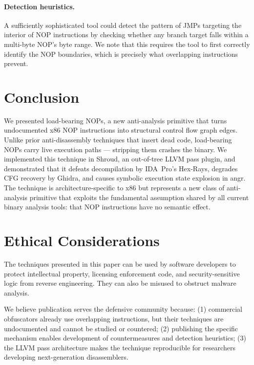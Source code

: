 \documentclass[letterpaper,twocolumn,10pt]{article}
\begin{document}
\paragraph{Detection heuristics.} A sufficiently sophisticated tool could detect the pattern of JMPs targeting the interior of NOP instructions by checking whether any branch target falls within a multi-byte NOP's byte range. We note that this requires the tool to first correctly identify the NOP boundaries, which is precisely what overlapping instructions prevent.

\section{Conclusion}

We presented load-bearing NOPs, a new anti-analysis primitive that turns undocumented x86 NOP instructions into structural control flow graph edges. Unlike prior anti-disassembly techniques that insert dead code, load-bearing NOPs carry live execution paths --- stripping them crashes the binary. We implemented this technique in Shroud, an out-of-tree LLVM pass plugin, and demonstrated that it defeats decompilation by IDA~Pro's Hex-Rays, degrades CFG recovery by Ghidra, and causes symbolic execution state explosion in angr. The technique is architecture-specific to x86 but represents a new class of anti-analysis primitive that exploits the fundamental assumption shared by all current binary analysis tools: that NOP instructions have no semantic effect.

\cleardoublepage
\appendix
\section*{Ethical Considerations}

The techniques presented in this paper can be used by software developers to protect intellectual property, licensing enforcement code, and security-sensitive logic from reverse engineering. They can also be misused to obstruct malware analysis.

We believe publication serves the defensive community because: (1) commercial obfuscators already use overlapping instructions, but their techniques are undocumented and cannot be studied or countered; (2) publishing the specific mechanism enables development of countermeasures and detection heuristics; (3) the LLVM pass architecture makes the technique reproducible for researchers developing next-generation disassemblers.
\end{document}
